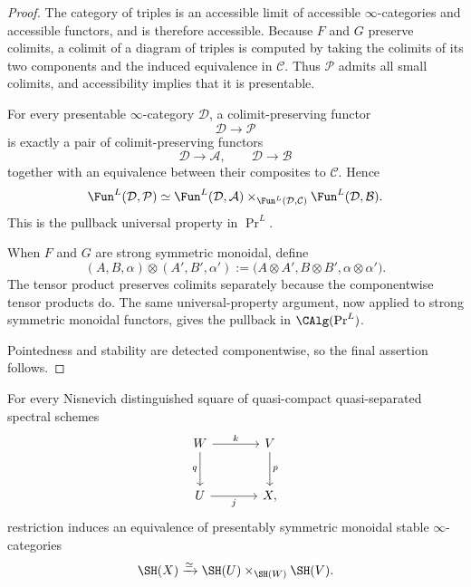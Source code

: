 \begin{proof}
The category of triples is an accessible limit of accessible
\(\infty\)-categories and accessible functors, and is therefore accessible.
Because \(F\) and \(G\) preserve colimits, a colimit of a diagram of triples
is computed by taking the colimits of its two components and the induced
equivalence in \(\mathcal C\).  Thus \(\mathcal P\) admits all small
colimits, and accessibility implies that it is presentable.

For every presentable \(\infty\)-category \(\mathcal D\), a
colimit-preserving functor
\[
    \mathcal D\longrightarrow\mathcal P
\]
is exactly a pair of colimit-preserving functors
\[
    \mathcal D\longrightarrow\mathcal A,
    \qquad
    \mathcal D\longrightarrow\mathcal B
\]
together with an equivalence between their composites to
\(\mathcal C\).  Hence
\[
\begin{aligned}
    \Fun^L(\mathcal D,\mathcal P)
    \simeq
    \Fun^L(\mathcal D,\mathcal A)
    \times_{\Fun^L(\mathcal D,\mathcal C)}
    \Fun^L(\mathcal D,\mathcal B).
\end{aligned}
\]
This is the pullback universal property in \(\Pr^L\).

When \(F\) and \(G\) are strong symmetric monoidal, define
\[
    (A,B,\alpha)\otimes(A',B',\alpha')
    :=
    \bigl(
      A\otimes A',
      B\otimes B',
      \alpha\otimes\alpha'
    \bigr).
\]
The tensor product preserves colimits separately because the componentwise
tensor products do.  The same universal-property argument, now applied to
strong symmetric monoidal functors, gives the pullback in
\(\CAlg(\Pr^L)\).

Pointedness and stability are detected componentwise, so the final assertion
follows.
\end{proof}

\begin{proposition}
\label{prop:SH-Nis-square}
For every Nisnevich distinguished square of quasi-compact quasi-separated
spectral schemes
\[
\begin{tikzcd}[column sep=large,row sep=large]
    W \arrow[r,"k"] \arrow[d,"q"']
        & V \arrow[d,"p"] \\
    U \arrow[r,"j"']
        & X,
\end{tikzcd}
\]
restriction induces an equivalence of presentably symmetric monoidal stable
\(\infty\)-categories
\[
    \SH(X)
    \xrightarrow{\simeq}
    \SH(U)\times_{\SH(W)}\SH(V).
\]
\end{proposition}

